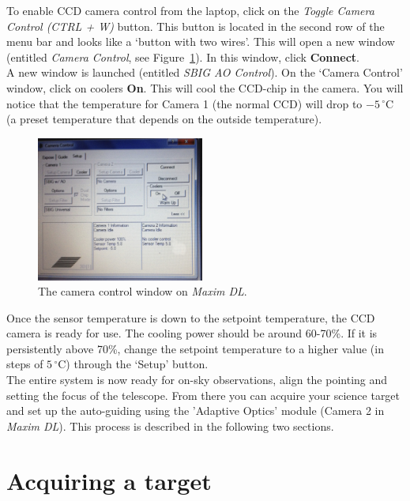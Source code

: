 \documentclass[12pt,twoside,a4paper]{report}
\begin{document}
To enable CCD camera control from the laptop, click on the \textit{Toggle Camera Control (CTRL + W)} button.
This button is located in the second row of the menu bar and looks like a `button with two wires'. 
This will open a new window (entitled \emph{Camera Control}, see Figure~\ref{fig:coolers}).  
In this window, click \textbf{Connect}.\\

A new window is launched (entitled \emph{SBIG AO Control}). On the `Camera Control' window, click on
coolers \textbf{On}. This will cool the CCD-chip in the camera. You will notice that the temperature for 
Camera 1 (the normal CCD) will drop to $-5 \,^{\circ}\mathrm{C}$ (a preset temperature that depends on the outside 
temperature).\\

\begin{figure}[ht]
 \centering
    \includegraphics[width=0.49\textwidth]{documentation_images/maximdl_cooler}
    \caption{\label{fig:coolers}The camera control window on \emph{Maxim DL}.}
\end{figure}

Once the sensor temperature is down to the setpoint temperature, the CCD camera is ready for use. 
The cooling power should be around 60-70\%. If it is persistently above 70\%, change the setpoint 
temperature to a higher value (in steps of $5 \,^{\circ}\mathrm{C}$) through the `Setup' button.\\

The entire system is now ready for on-sky observations, align the pointing and setting the focus of the telescope. From there you can acquire your science target and set up the auto-guiding using the 'Adaptive Optics' module (Camera 2 in \emph{Maxim DL}). This process is described in the following two sections.

\section{Acquiring a target}
\label{acquire}
\end{document}
